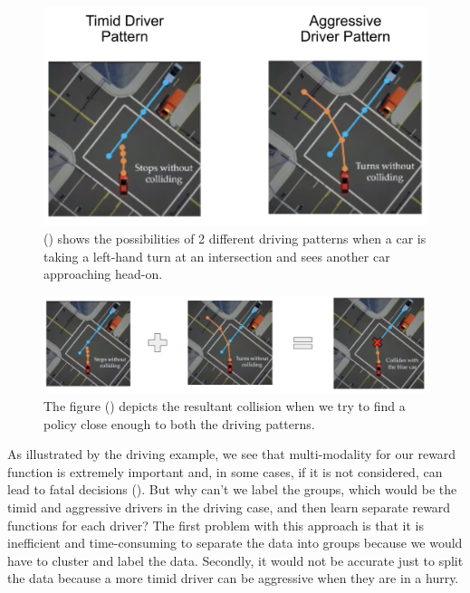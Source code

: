 \documentclass[
  letterpaper,
  DIV=11,
  numbers=noendperiod,
  oneside]{scrreprt}
\theoremstyle{remark}
\begin{document}
\begin{figure}

{\centering \includegraphics{Figures/driving-patt.png}

}

\caption{() shows the
possibilities of 2 different driving patterns when a car is taking a
left-hand turn at an intersection and sees another car approaching
head-on.}

\end{figure}%
\begin{figure}

{\centering \includegraphics{Figures/driving-coll.png}

}

\caption{The figure ()
depicts the resultant collision when we try to find a policy close
enough to both the driving patterns.}

\end{figure}%

As illustrated by the driving example, we see that multi-modality for
our reward function is extremely important and, in some cases, if it is
not considered, can lead to fatal decisions
(). But why can't we
label the groups, which would be the timid and aggressive drivers in the
driving case, and then learn separate reward functions for each driver?
The first problem with this approach is that it is inefficient and
time-consuming to separate the data into groups because we would have to
cluster and label the data. Secondly, it would not be accurate just to
split the data because a more timid driver can be aggressive when they
are in a hurry.
\end{document}
